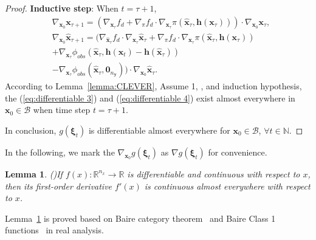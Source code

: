 \documentclass[conference]{IEEEtran}
\newtheorem{lemma}{\bf Lemma}
\newtheorem{proof}{\bf Proof}
\newcommand{\myvec}[1]{\boldsymbol{#1}}
\newcommand{\mymatrix}[1]{\boldsymbol{#1}}
\newcommand{\calB}{\mathcal{B}}
\newcommand{\bbR}{\mathbb{R}}
\newcommand{\bbN}{\mathbb{N}}
\begin{document}
\begin{proof}
    \textbf{Inductive step}: When $t = \tau + 1$, 
    \begin{subequations}
      \begin{align}
        &\nabla_{\myvec{x}_{0}}\myvec{x}_{\tau + 1} = (\nabla_{\myvec{x}_{\tau}}f_{d} 
        + \nabla_{\pi}f_{d} \cdot 
        \nabla_{\myvec{x}_{\tau}}\pi(\hat{\myvec{x}}_{\tau}, \myvec{h}(\myvec{x}_{\tau}))) 
        \cdot \nabla_{\myvec{x}_{0}}\myvec{x}_{\tau}, \label{eq:differentiable 3}\\
        &\nabla_{\myvec{x}_{0}}\hat{\myvec{x}}_{\tau + 1} = (\nabla_{\hat{\myvec{x}}_{\tau}}f_{d} 
        \cdot \nabla_{\myvec{x}_{\tau}}\hat{\myvec{x}}_{\tau} + \nabla_{\pi}f_{d} \cdot 
        \nabla_{\myvec{x}_{\tau}}\pi(\hat{\myvec{x}}_{\tau}, \myvec{h}(\myvec{x}_{\tau})) \nonumber \\
        & + \nabla_{\myvec{x}_{\tau}}\phi_{obs}
        (\hat{\myvec{x}}_{\tau}, \myvec{h}(\myvec{x}_{t}) - \myvec{h}(\hat{\myvec{x}}_{\tau}))\nonumber \\
        &- \nabla_{\myvec{x}_{\tau}}\phi_{obs}(\hat{\myvec{x}}_{\tau}, \myvec{0}_{n_{\myvec{y}}})) 
        \cdot \nabla_{\myvec{x}_{0}}\hat{\myvec{x}}_{\tau}. \label{eq:differentiable 4}
      \end{align}
    \end{subequations}
    According to Lemma~\ref{lemma:CLEVER}, Assume 1, \cite{lyapunov1992general}, and induction hypothesis, 
    the (\ref{eq:differentiable 3}) and (\ref{eq:differentiable 4}) exist almost everywhere in $\myvec{x}_{0} \in \calB$ 
    when time step $t = \tau + 1$. 
  
    In conclusion, $g(\myvec{\xi}_{t})$ is differentiable almost everywhere 
    for $\myvec{x}_{0} \in \calB$, $\forall t \in \bbN$. 
    
    
\end{proof}

In the following, we mark the $\nabla_{\myvec{x}_{0}} g(\myvec{\xi}_{t})$ as 
$\nabla g(\myvec{\xi}_{t})$ for convenience. 

\begin{lemma}(\cite{ponce2007continuity})\label{lemma:differentiable continuity}
  If $f(x):\bbR^{n_{x}} \to \bbR$ is differentiable and continuous 
  with respect to $x$, then its first-order derivative 
  $f'(x)$ is continuous almost everywhere with respect to 
  $x$. 
\end{lemma}
Lemma~\ref{lemma:differentiable continuity} is proved based on 
Baire category theorem~\cite{de1963subcompactness} and 
Baire Class 1 functions~\cite{kechris1990classification} in real analysis. 
\end{document}
